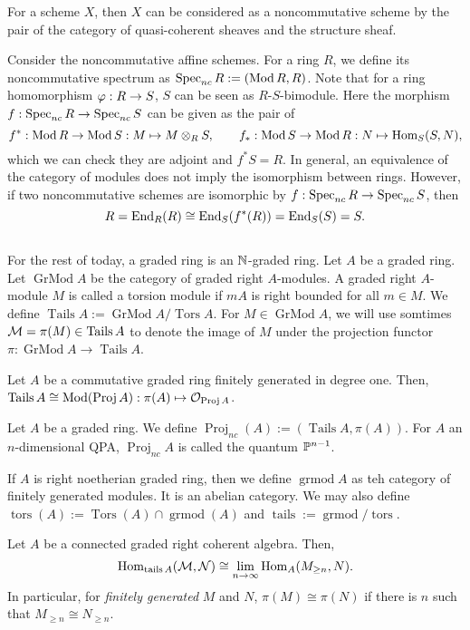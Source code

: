 \documentclass{../../../small}
\newcommand{\GrMod}{\operatorname{GrMod}}
\newcommand{\Tors}{\operatorname{Tors}}
\newcommand{\Tails}{\operatorname{Tails}}
\newcommand{\Proj}{\operatorname{Proj}}
\newcommand{\grmod}{\operatorname{grmod}}
\newcommand{\tors}{\operatorname{tors}}
\newcommand{\tails}{\operatorname{tails}}
\begin{document}
For a scheme $X$, then $X$ can be considered as a noncommutative scheme by the pair of the category of quasi-coherent sheaves and the structure sheaf.

Consider the noncommutative affine schemes.
For a ring $R$, we define its noncommutative spectrum as $\Spec_{nc}R:=(\Mod R,R)$.
Note that for a ring homomorphism $\f:R\to S$, $S$ can be seen as $R$-$S$-bimodule.
Here the morphism $f:\Spec_{nc}R\to\Spec_{nc}S$ can be given as the pair of
\[f^*:\Mod R\to\Mod S:M\mapsto M\otimes_RS,\qquad f_*:\Mod S\to\Mod R:N\mapsto\Hom_S(S,N),\]
which we can check they are adjoint and $f^*S=R$.
In general, an equivalence of the category of modules does not imply the isomorphism between rings.
However, if two noncommutative schemes are isomorphic by $f:\Spec_{nc}R\to\Spec_{nc}S$, then
\[R=\End_R(R)\cong\End_S(f^*(R))=\End_S(S)=S.\]

\subsection{}
For the rest of today, a graded ring is an $\N$-graded ring.
Let $A$ be a graded ring.
Let $\GrMod A$ be the category of graded right $A$-modules.
A graded right $A$-module $M$ is called a torsion module if $mA$ is right bounded for all $m\in M$.
We define $\Tails A:=\GrMod A/\Tors A$.
For $M\in\GrMod A$, we will use somtimes $\cM=\pi(M)\in\Tails A$ to denote the image of $M$ under the projection functor $\pi:\GrMod A\to\Tails A$.

\begin{thm}[Serre]
Let $A$ be a commutative graded ring finitely generated in degree one.
Then, $\Tails A\cong\Mod(\Proj A):\pi(A)\mapsto\cO_{\Proj A}$.
\end{thm}
\begin{defn}
Let $A$ be a graded ring.
We define $\Proj_{nc}(A):=(\Tails A,\pi(A))$.
For $A$ an $n$-dimensional QPA, $\Proj_{nc}A$ is called the quantum $\P^{n-1}$.
\end{defn}

If $A$ is right noetherian graded ring, then we define $\grmod A$ as teh category of finitely generated modules.
It is an abelian category.
We may also define $\tors(A):=\Tors(A)\cap\grmod(A)$ and $\tails:=\grmod/\tors$.

\begin{thm}
Let $A$ be a connected graded right coherent algebra.
Then,
\[\Hom_{\tails A}(\cM,\cN)\cong\lim_{n\to\infty}\Hom_A(M_{\ge n},N).\]
In particular, for \emph{finitely generated} $M$ and $N$, $\pi(M)\cong\pi(N)$ if there is $n$ such that $M_{\ge n}\cong N_{\ge n}$.
\end{thm}
\end{document}
